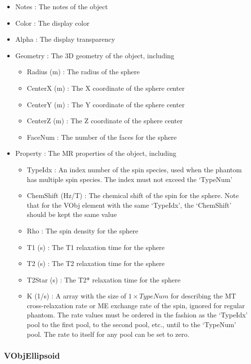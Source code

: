 \documentclass{book}%
\begin{document}
\begin{itemize}
	\item Notes : The notes of the object
	\item Color : The display color
	\item Alpha : The display transparency
	\item Geometry : The 3D geometry of the object, including
	\begin{itemize}
		\item Radius (m) : The radius of the sphere
		\item CenterX (m) : The X coordinate of the sphere center
		\item CenterY (m) : The Y coordinate of the sphere center
		\item CenterZ (m) : The Z coordinate of the sphere center
		\item FaceNum : The number of the faces for the sphere
	\end{itemize}
	\item Property : The MR properties of the object, including
	\begin{itemize}
		\item TypeIdx : An index number of the spin species, used when the phantom has multiple spin species. The index must not exceed the `TypeNum'
		\item ChemShift (Hz/T) : The chemical shift of the spin for the sphere. Note that for the VObj element with the same `TypeIdx', the `ChemShift' should be kept the same value
		\item Rho : The spin density for the sphere
		\item T1 (s) : The T1 relaxation time for the sphere
		\item T2 (s) : The T2 relaxation time for the sphere
		\item T2Star (s) : The T2* relaxation time for the sphere
		\item K (1/s) : A array with the size of $1 \times TypeNum$ for describing the MT cross-relaxation rate or ME exchange rate of the spin, ignored for regular phantom. The rate values must be ordered in the fashion as the `TypeIdx' pool to the first pool, to the second pool, etc., until to the `TypeNum' pool. The rate to itself for any pool can be set to zero.
	\end{itemize}
\end{itemize}


\subsubsection{VObjEllipsoid}
\end{document}
